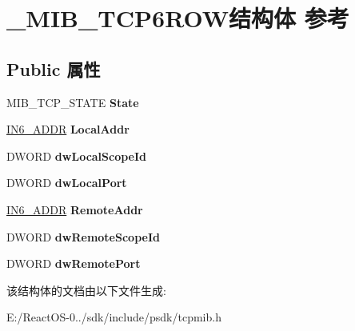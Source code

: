 \hypertarget{struct___m_i_b___t_c_p6_r_o_w}{}\section{\+\_\+\+M\+I\+B\+\_\+\+T\+C\+P6\+R\+O\+W结构体 参考}
\label{struct___m_i_b___t_c_p6_r_o_w}
\subsection*{Public 属性}
\begin{DoxyCompactItemize}
\item 
\mbox{\label{struct___m_i_b___t_c_p6_r_o_w_a68fb23597c4232e9c80ec335aded78fe}} 
M\+I\+B\+\_\+\+T\+C\+P\+\_\+\+S\+T\+A\+TE {\bfseries State}
\item 
\mbox{\label{struct___m_i_b___t_c_p6_r_o_w_ac4883f122d8240a947c9feb543604641}} 
\hyperlink{structin6__addr}{I\+N6\+\_\+\+A\+D\+DR} {\bfseries Local\+Addr}
\item 
\mbox{\label{struct___m_i_b___t_c_p6_r_o_w_a9bf4d556c22432390c62a5e86d960e4a}} 
D\+W\+O\+RD {\bfseries dw\+Local\+Scope\+Id}
\item 
\mbox{\label{struct___m_i_b___t_c_p6_r_o_w_a065825e658df291a435d0161ced808ba}} 
D\+W\+O\+RD {\bfseries dw\+Local\+Port}
\item 
\mbox{\label{struct___m_i_b___t_c_p6_r_o_w_a9148b788227df05c7dd29a07889da027}} 
\hyperlink{structin6__addr}{I\+N6\+\_\+\+A\+D\+DR} {\bfseries Remote\+Addr}
\item 
\mbox{\label{struct___m_i_b___t_c_p6_r_o_w_ad1f6e8152fd9eef06c9446176a53f31c}} 
D\+W\+O\+RD {\bfseries dw\+Remote\+Scope\+Id}
\item 
\mbox{\label{struct___m_i_b___t_c_p6_r_o_w_a2d0541de096a5a1cef96713b279fa6ce}} 
D\+W\+O\+RD {\bfseries dw\+Remote\+Port}
\end{DoxyCompactItemize}


该结构体的文档由以下文件生成\+:\begin{DoxyCompactItemize}
\item 
E\+:/\+React\+O\+S-\/0../sdk/include/psdk/tcpmib.\+h\end{DoxyCompactItemize}
